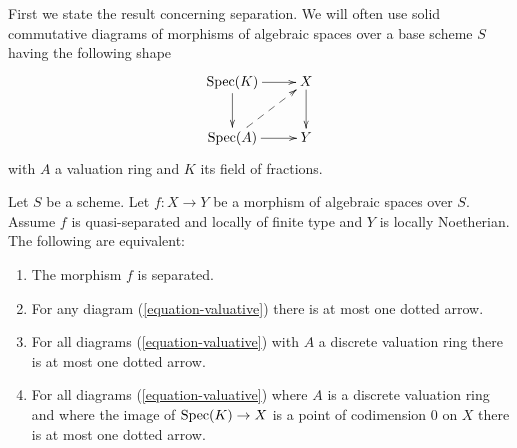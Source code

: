 \noindent
First we state the result concerning
separation. We will often use solid commutative diagrams of morphisms of
algebraic spaces over a base scheme $S$ having the following shape
\begin{equation}
\label{equation-valuative}
\vcenter{
\xymatrix{
\Spec(K) \ar[r] \ar[d] & X \ar[d] \\
\Spec(A) \ar[r] \ar@{-->}[ru] & Y
}
}
\end{equation}
with $A$ a valuation ring and $K$ its field of fractions.

\begin{lemma}
\label{lemma-Noetherian-dvr-valuative-separation}
Let $S$ be a scheme. Let $f : X \to Y$ be a morphism of algebraic spaces
over $S$. Assume $f$ is quasi-separated and locally of finite type and
$Y$ is locally Noetherian. The following are equivalent:
\begin{enumerate}
\item The morphism $f$ is separated.
\item For any diagram (\ref{equation-valuative}) there is at most
one dotted arrow.
\item For all diagrams (\ref{equation-valuative}) with $A$ a discrete
valuation ring there is at most one dotted arrow.
\item For all diagrams (\ref{equation-valuative}) where $A$ is a discrete
valuation ring and where the image of $\mathop{\mathrm{Spec}}(K) \to X$ is a point of
codimension $0$ on $X$ there is at most one dotted arrow.
\end{enumerate}
\end{lemma}

